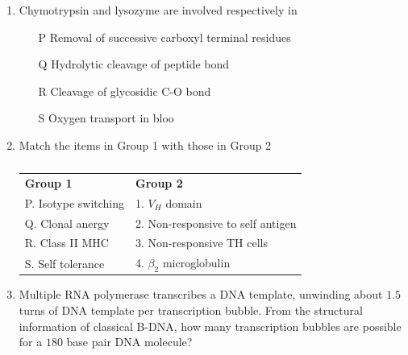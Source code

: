 \documentclass[journal,12pt,onecolumn]{IEEEtran}
\theoremstyle{remark}
\begin{document}
\begin{enumerate}
\item Chymotrypsin and lysozyme are involved respectively in 
\hfill{}

\begin{enumerate}
\item[P] Removal of successive carboxyl terminal residues
\item[Q] Hydrolytic cleavage of peptide bond 
\item[R] Cleavage of glycosidic C-O bond
\item[S] Oxygen transport in bloo
\end{enumerate}

\begin{enumerate}
\end{enumerate}

\item Match the items in Group 1 with those in Group 2 
\hfill{}

\begin{table}[h]
\centering
\begin{tabular}{ll}
\textbf{Group 1} & \textbf{Group 2} \\
P. Isotype switching & 1. $V_H$ domain \\
Q. Clonal anergy & 2. Non-responsive to self antigen \\
R. Class II MHC & 3. Non-responsive TH cells \\
S. Self tolerance & 4. $\beta_2$ microglobulin \\
\end{tabular}
\caption*{}
\label{tab:q12}
\end{table}

\begin{enumerate}
\end{enumerate}

\item Multiple RNA polymerase transcribes a DNA template, unwinding about $1.5$ turns of DNA template per transcription bubble. From the structural information of classical B-DNA, how many transcription bubbles are possible for a $180$ base pair DNA molecule?
\hfill{}


\end{enumerate}
\end{document}
